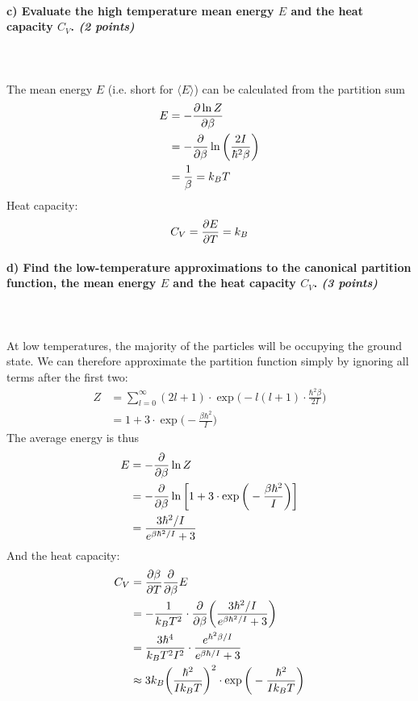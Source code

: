 \paragraph{c) Evaluate the high temperature mean energy $E$ and the heat 
    capacity $C_V$. \textit{(2 points)}
} \ \\
\\
    The mean energy $E$ (i.e. short for $\langle E\rangle$) can be 
    calculated from the partition sum
    \begin{align}
        E
        &=-\frac{\partial \ln Z}{\partial \beta} \\
        &=-\frac{\partial }{\partial \beta}\ln\bigg(
            \frac{2I}{\hbar^2\beta}
        \bigg) \\
        &=\frac{1}{\beta}=k_BT
    \end{align}
    Heat capacity:
    \begin{align}
        C_V
        =\frac{\partial E}{\partial T}
        =k_B
    \end{align}

\paragraph{d) Find the low-temperature approximations to the canonical 
    partition function, the mean energy $E$ and the heat capacity $C_V$.
    \textit{(3 points)}
} \ \\
\\
    At low temperatures, the majority of the particles will 
    be occupying the ground state. We can therefore approximate
    the partition function simply by ignoring all terms after 
    the first two:
    \begin{align}
        Z
        &=\sum_{l=0}^{\infty}(2l+1)\cdot\exp\bigg(
            -l(l+1)\cdot\frac{\hbar^2\beta}{2I}
        \bigg) \\
        &=1+3\cdot\exp\bigg(
            -\frac{\beta\hbar^2}{I}
        \bigg)
    \end{align}
    The average energy is thus
    \begin{align}
        E
        &=-\frac{\partial }{\partial \beta}\ln Z \\
        &=-\frac{\partial }{\partial \beta}\ln\bigg[
            1+3\cdot\exp\bigg(
                -\frac{\beta\hbar^2}{I}
            \bigg)
        \bigg] \\
        &=\frac{3\hbar^2/I}{e^{\beta\hbar^2/I}+3}
    \end{align}
    And the heat capacity:
    \begin{align}
        C_V
        &=\frac{\partial \beta}{\partial T}\frac{\partial }{\partial \beta}E \\
        &=-\frac{1}{k_BT^2}\cdot\frac{\partial }{\partial \beta}\bigg(
            \frac{3\hbar^2/I}{e^{\beta\hbar^2/I}+3}
        \bigg) \\
        &=\frac{3\hbar^4}{k_BT^2I^2}\cdot
        \frac{e^{\hbar^2\beta/I}}{e^{\beta\hbar/I}+3} \\
        &\approx3k_B\bigg(
            \frac{\hbar^2}{Ik_BT}
        \bigg)^2\cdot\exp\bigg(
            -\frac{\hbar^2}{Ik_BT}
        \bigg)
    \end{align}
    
